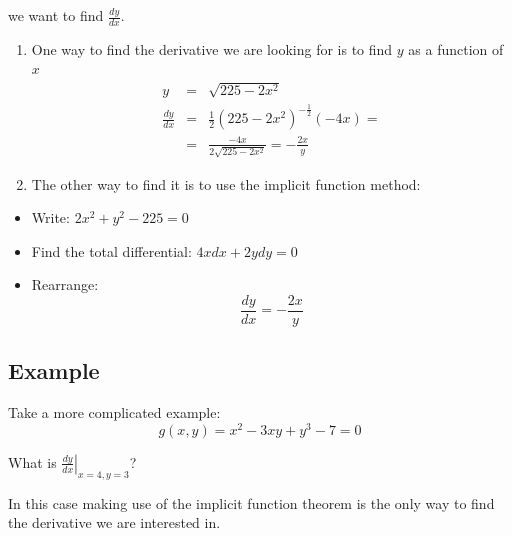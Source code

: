 \documentclass[11pt,english]{article}
\begin{document}
we want to find $\frac{dy}{dx}.$

\bigskip

\begin{enumerate}
\item One way to find the derivative we are looking for is to find $y$ as a
function of $x$%
\begin{eqnarray*}
y &=&\sqrt{225-2x^{2}} \\
\frac{dy}{dx} &=&\frac{1}{2}\left( 225-2x^{2}\right) ^{-\frac{1}{2}}(-4x)= \\
&=&\frac{-4x}{2\sqrt{225-2x^{2}}}=-\frac{2x}{y}
\end{eqnarray*}

\item The other way to find it is to use the implicit function method:
\end{enumerate}

\begin{itemize}
\item Write: $2x^{2}+y^{2}-225=0$

\item Find the total differential: $4xdx+2ydy=0$

\item Rearrange: 
\begin{equation*}
\frac{dy}{dx}=-\frac{2x}{y}
\end{equation*}
\end{itemize}

\subsection{Example}

Take a more complicated example: 
\begin{equation*}
g(x,y)=x^{2}-3xy+y^{3}-7=0
\end{equation*}

What is $\left. \frac{dy}{dx}\right| _{x=4,y=3}$?

In this case making use of the implicit function theorem is the only way to
find the derivative we are interested in.
\end{document}
